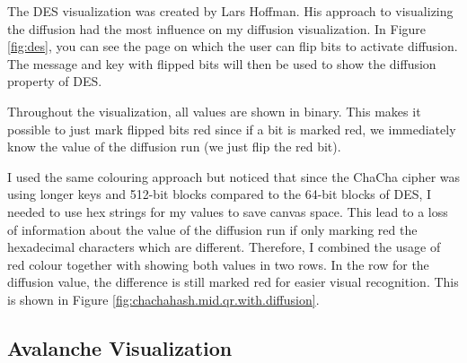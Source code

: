 The DES visualization was created by Lars Hoffman. His approach to visualizing the diffusion had the most influence on my diffusion visualization. In Figure \ref{fig:des}, you can see the page on which the user can flip bits to activate diffusion. The message and key with flipped bits will then be used to show the diffusion property of DES. 

Throughout the visualization, all values are shown in binary. This makes it possible to just mark flipped bits red since if a bit is marked red, we immediately know the value of the diffusion run (we just flip the red bit). 

I used the same colouring approach but noticed that since the ChaCha cipher was using longer keys and 512-bit blocks compared to the 64-bit blocks of DES, I needed to use hex strings for my values to save canvas space. This lead to a loss of information about the value of the diffusion run if only marking red the hexadecimal characters which are different. Therefore, I combined the usage of red colour together with showing both values in two rows. In the row for the diffusion value, the difference is still marked red for easier visual recognition. This is shown in Figure \ref{fig:chachahash.mid.qr.with.diffusion}.

\subsection{Avalanche Visualization}
\label{sec:avalancheVisualization}

